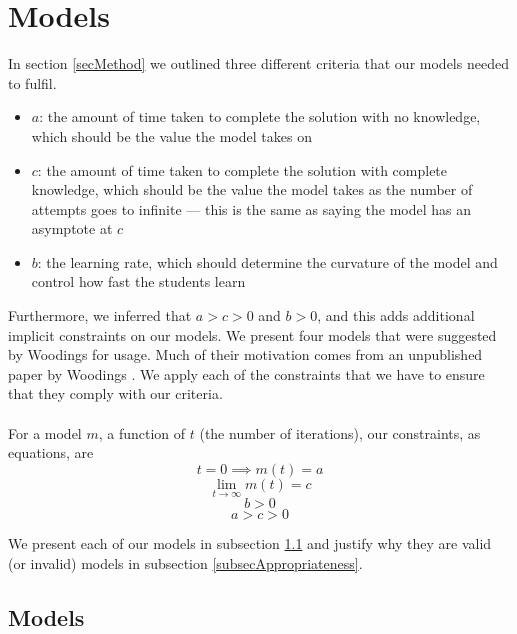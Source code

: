 \section{Models} \label{secModels}

In section \ref{secMethod} we outlined three different criteria that our models
needed to fulfil.

\begin{itemize}
  \item $a$: the amount of time taken to complete the solution with no knowledge,
  which should be the value the model takes on \AZ
  \item $c$: the amount of time taken to complete the solution with complete
  knowledge, which should be the value the model takes as the number of attempts
  goes to infinite --- this is the same as saying the model has an asymptote at $c$
  \item $b$: the learning rate, which should determine the curvature of the
  model and control how fast the students learn
\end{itemize}

Furthermore, we inferred that $a > c > 0$ and $b > 0$, and this adds additional
implicit constraints on our models.
We present four models that were suggested by Woodings for usage.
Much of their motivation comes from an unpublished paper by Woodings \cite{WoodingsUnpublished}.
We apply each of the constraints that we have to ensure that they comply with
our criteria.\\
\\
For a model $m$, a function of $t$ (the number of iterations), our constraints, as equations, are
\begin{equation} \label{conOne}
  t = 0 \implies m(t) = a
\end{equation}
\begin{equation} \label{conTwo}
  \lim_{t \to \infty} m(t) = c
\end{equation}
\begin{equation} \label{conThree}
  b > 0
\end{equation}
\begin{equation} \label{conFour}
  a > c > 0
\end{equation}

We present each of our models in subsection \ref{subsecModels} and justify why
they are valid (or invalid) models in subsection \ref{subsecAppropriateness}.

\subsection{Models} \label{subsecModels}

